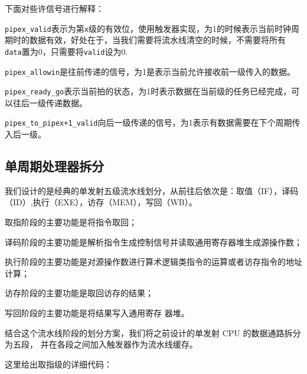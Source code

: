 下面对些许信号进行解释：

\texttt{pipex\_valid}表示为第\texttt{x}级的有效位，使用触发器实现，为1的时候表示当前时钟周期时的数据有效，好处在于，当我们需要将流水线清空的时候，不需要将所有\texttt{data}置为0，只需要将\texttt{valid}设为0.

\texttt{pipex\_allowin}是往前传递的信号，为1是表示当前允许接收前一级传入的数据。

\texttt{pipex\_ready\_go}表示当前拍的状态，为1时表示数据在当前级的任务已经完成，可以往后一级传递数据。

\texttt{pipex\_to\_pipex+1\_valid}向后一级传递的信号，为1表示有数据需要在下个周期传入后一级。

\subsection{单周期处理器拆分}

我们设计的是经典的单发射五级流水线划分，从前往后依次是：取值（IF），译码（ID）,执行（EXE），访存（MEM），写回（WB）。

取指阶段的主要功能是将指令取回；

译码阶段的主要功能是解析指令生成控制信号并读取通用寄存器堆生成源操作数；

执行阶段的主要功能是对源操作数进行算术逻辑类指令的运算或者访存指令的地址计算；

访存阶段的主要功能是取回访存的结果；

写回阶段的主要功能是将结果写入通用寄存
器堆。

结合这个流水线阶段的划分方案，我们将之前设计的单发射 CPU 的数据通路拆分为五段，
并在各段之间加入触发器作为流水线缓存。

这里给出取指级的详细代码：

